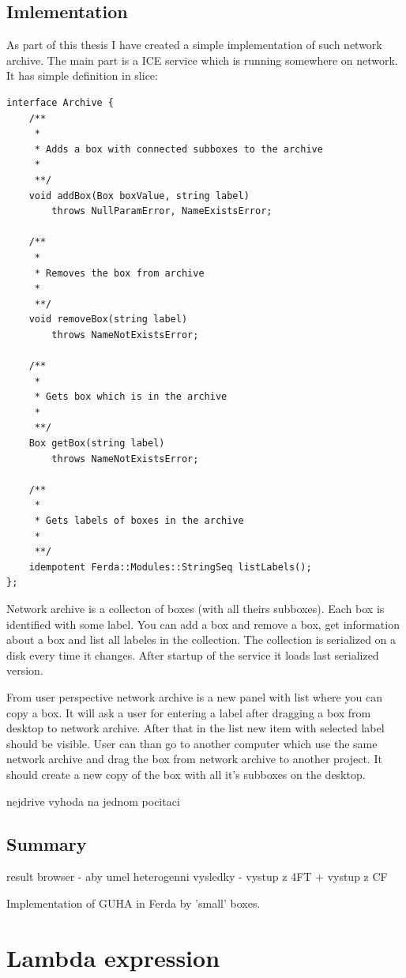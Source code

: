 \documentclass{article}
\begin{document}
\subsection{Imlementation}
As part of this thesis I have created a simple implementation of such network archive. The main part is a ICE service which is running somewhere on network. It has simple definition in slice:
\begin{verbatim}
interface Archive {
	/**
	 *
	 * Adds a box with connected subboxes to the archive
	 *
	 **/
	void addBox(Box boxValue, string label)
		throws NullParamError, NameExistsError;

	/**
	 *
	 * Removes the box from archive
	 *
	 **/
	void removeBox(string label)
		throws NameNotExistsError;

	/**
	 *
	 * Gets box which is in the archive
	 *
	 **/
	Box getBox(string label)
		throws NameNotExistsError;

	/**
	 *
	 * Gets labels of boxes in the archive
	 *
	 **/
	idempotent Ferda::Modules::StringSeq listLabels();
};
\end{verbatim}

Network archive is a collecton of boxes (with all theirs subboxes). Each box is identified with some label. You can add a box and remove a box, get information about a box and list all labeles in the collection. The collection is serialized on a disk every time it changes. After startup of the service it loads last serialized version.

From user perspective network archive is a new panel with list where you can copy a box. It will ask a user for entering a label after dragging a box from desktop to network archive. After that in the list new item with selected label should be visible. User can than go to another computer which use the same network archive and drag the box from network archive to another project. It should create a new copy of the box with all it's subboxes on the desktop.

nejdrive vyhoda na jednom pocitaci
\subsection{Summary}

result browser - aby umel heterogenni vysledky - vystup z 4FT + vystup z CF

Implementation of GUHA in Ferda by 'small' boxes.
\section{Lambda expression}
\end{document}
